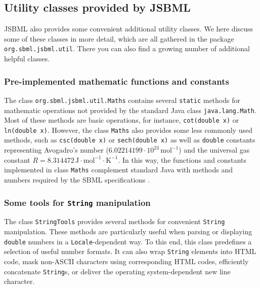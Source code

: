 \subsection{Utility classes provided by JSBML}

JSBML also provides some convenient additional utility classes. We here discuss
some of these classes in more detail, which are all gathered in
the package \texttt{org.sbml.jsbml.util}. There you can also find a growing
number of additional helpful classes.


\subsubsection{Pre-implemented mathematic functions and constants}

The class \texttt{org.sbml.jsbml.util.Maths}
%
contains several \texttt{static} methods for mathematic operations not provided
by the standard Java class \texttt{java.lang.Math}. Most of these methods are
basic operations, for instance, \texttt{cot(double x)} or \texttt{ln(double x)}.
However, the class \texttt{Maths} also provides some less commonly used methods,
such as \texttt{csc(double x)} or \texttt{sech(double x)} as well as
\texttt{double} constants representing Avogadro's number ($6.02214199 \cdot
10^{23}\,\mathrm{mol}^{-1}$) and the universal gas constant
$R = 8.314472\,\mathrm{J}\cdot\mathrm{mol}^{-1}\cdot\mathrm{K}^{-1}$. In this
way, the functions and constants implemented in class \texttt{Maths} complement
standard Java with methods and numbers required by the SBML specifications
\citep{Hucka2003, Hucka2008, Hucka2010a}.

\subsubsection{Some tools for \texttt{String} manipulation}

The class \texttt{StringTools}
%
provides several methods for convenient \texttt{String} manipulation. These
methods are particularly useful when parsing or displaying \texttt{double}
numbers in a \texttt{Locale}\hyp{}dependent way. To this end, this class
predefines a selection of useful number formats. It can also wrap
\texttt{String} elements into HTML code, mask non-ASCII characters using
corresponding HTML codes, efficiently concatenate \texttt{String}s, or deliver
the operating system\hyp{}dependent new line character.



